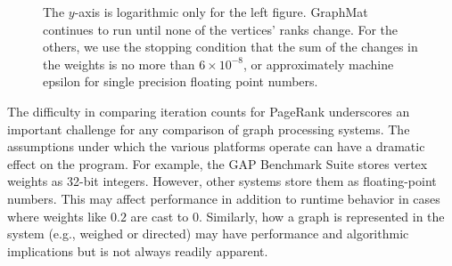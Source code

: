 \documentclass[conference]{IEEEtran}
\begin{document}
\begin{figure}
\begin{minipage}{0.48\linewidth}
	\end{minipage}
	\caption{The $y$-axis is logarithmic only for the left figure. GraphMat continues to run until none of the vertices' ranks change. For the others, we use the stopping condition that the sum of the changes in the weights is no more than $6 \times 10^{-8}$, or approximately machine epsilon for single precision floating point numbers.}
	\label{fig:pr}
\end{figure}

The difficulty in comparing iteration counts for PageRank underscores an important challenge for any comparison of graph processing systems. The assumptions under which the various platforms operate can have a dramatic effect on the program. For example, the GAP Benchmark Suite stores vertex weights as 32-bit integers. However, other systems store them as floating-point numbers. This may affect performance in addition to runtime behavior in cases where weights like $0.2$ are cast to $0$. Similarly, how a graph is represented in the system (e.g., weighed or directed) may have performance and algorithmic implications but is not always readily apparent.
\end{document}
